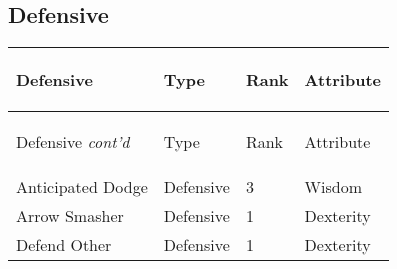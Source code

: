 \documentclass[twoside]{book}
\begin{document}
\begin{multicols}{2}
{  
           }\vspace{1ex}


    \hspace{-2ex}


\vspace{1ex}


    
\end{multicols}
  
    

\subsection{Defensive}
    
\begin{longtable}{p{1.25in}lll} 
  Defensive
  &
  \begin{turn}{70}{Type}\end{turn}
          
  &
  \begin{turn}{70}{Rank}\end{turn}
          
  &
  \begin{turn}{70}{Attribute}\end{turn}
          
  \\
  \hline
  \hline
  \endfirsthead
  Defensive \textit{cont'd}
        
  &
  \begin{turn}{70}{Type}\end{turn}
          
  &
  \begin{turn}{70}{Rank}\end{turn}
          
  &
  \begin{turn}{70}{Attribute}\end{turn}
          
  \\
  \hline
  \endhead
      
  \raggedright
           Anticipated Dodge 
  &
   Defensive 
  &
   3 
  &
   Wisdom 
  \tabularnewline
      
  \raggedright
           Arrow Smasher 
  &
   Defensive 
  &
   1 
  &
   Dexterity 
  \tabularnewline
      
  \raggedright
           Defend Other 
  &
   Defensive 
  &
   1 
  &
   Dexterity 
  \tabularnewline
      

\end{longtable}
\end{document}
